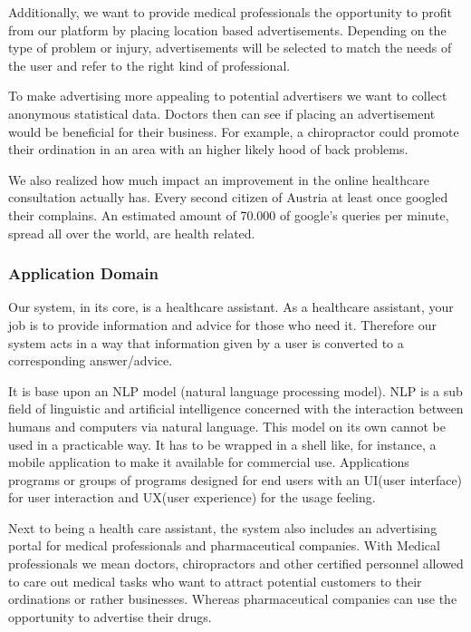 \documentclass[12pt]{article}
\theoremstyle{definition}
\begin{document}
Additionally, we want to provide medical professionals the opportunity to profit from our platform by placing location based advertisements. Depending on the type of problem or injury, advertisements will be selected to match the needs of the user and refer to the right kind of professional. 

To make advertising more appealing to potential advertisers we want to collect anonymous statistical data. Doctors then can see if placing an advertisement would be beneficial for their business. For example, a chiropractor could promote their ordination in an area with an higher likely hood of back problems.

We also realized how much impact an improvement in the online healthcare consultation actually has. Every second citizen of Austria at least once googled their complains. An estimated amount of 70.000 of google's queries per minute, spread all over the world, are health related.

\pagebreak

\subsubsection{Application Domain}

Our system, in its core, is a healthcare assistant. As a healthcare assistant, your job is to provide information and advice for those who need it. Therefore our system acts in a way that information given by a user is converted to a corresponding answer/advice. 

It is base upon an NLP model (natural language processing model). NLP is a sub field of linguistic and artificial intelligence concerned with the interaction between humans and computers via natural language. This model on its own cannot be used in a practicable way. It has to be wrapped in a shell like, for instance, a mobile application to make it available for commercial use. Applications programs or groups of programs designed for end users with an UI(user interface) for user interaction and UX(user experience) for the usage feeling.

Next to being a health care assistant, the system also includes an advertising portal for medical professionals and pharmaceutical companies. With Medical professionals we mean doctors, chiropractors and other certified personnel allowed to care out medical tasks who want to attract potential customers to their ordinations or rather businesses. Whereas pharmaceutical companies can use the opportunity to advertise their drugs.
\end{document}
